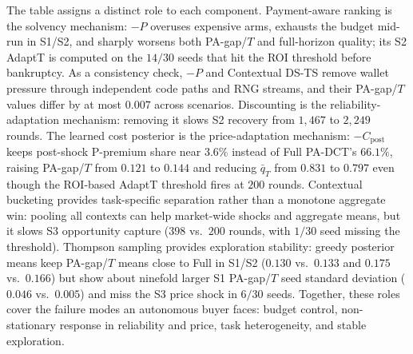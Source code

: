The table assigns a distinct role to each component. Payment-aware ranking is the solvency mechanism: $-P$ overuses expensive arms, exhausts the budget mid-run in S1/S2, and sharply worsens both PA-gap/$T$ and full-horizon quality; its S2 AdaptT is computed on the $14/30$ seeds that hit the ROI threshold before bankruptcy. As a consistency check, $-P$ and Contextual DS-TS remove wallet pressure through independent code paths and RNG streams, and their PA-gap/$T$ values differ by at most $0.007$ across scenarios. Discounting is the reliability-adaptation mechanism: removing it slows S2 recovery from $1{,}467$ to $2{,}249$ rounds. The learned cost posterior is the price-adaptation mechanism: $-C_{\mathrm{post}}$ keeps post-shock P-premium share near $3.6\%$ instead of Full PA-DCT's $66.1\%$, raising PA-gap/$T$ from $0.121$ to $0.144$ and reducing $\bar q_T$ from $0.831$ to $0.797$ even though the ROI-based AdaptT threshold fires at $200$ rounds. Contextual bucketing provides task-specific separation rather than a monotone aggregate win: pooling all contexts can help market-wide shocks and aggregate means, but it slows S3 opportunity capture ($398$ vs.\ $200$ rounds, with $1/30$ seed missing the threshold). Thompson sampling provides exploration stability: greedy posterior means keep PA-gap/$T$ means close to Full in S1/S2 ($0.130$ vs.\ $0.133$ and $0.175$ vs.\ $0.166$) but show about ninefold larger S1 PA-gap/$T$ seed standard deviation ($0.046$ vs.\ $0.005$) and miss the S3 price shock in $6/30$ seeds. Together, these roles cover the failure modes an autonomous buyer faces: budget control, non-stationary response in reliability and price, task heterogeneity, and stable exploration.
